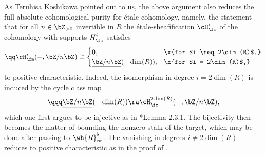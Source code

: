 \brems
\remi
As Teruhisa Koshikawa pointed out to us, the above argument also reduces the full absolute cohomological purity for \'{e}tale cohomology, namely, the statement that for all $n \in \bZ_{> 0}$ invertible in $R$ the \'{e}tale-sheafification $\cH^i_\fm$ of the cohomology with supports $H^i_\fm$ satisfies
\[
\qq \cH^i_\fm(-, \bZ/n\bZ) \cong \begin{cases} 0, & \x{for $i \neq 2\dim(R)$,} \\ \underline{\bZ/n\bZ}(-\dim(R)), & \x{for $i = 2\dim(R)$,} \end{cases}
\]
to positive characteristic. Indeed, the isomorphism in degree $i = 2\dim(R)$ is induced by the cycle class map
\[
\qqq \underline{\bZ/n\bZ}(-\dim(R)) \ra \cH^{2\dim(R)}_\fm(-, \bZ/n\bZ),
\]
which one first argues to be injective as in \cite{Fuj02}*{Lemma 2.3.1}. The bijectivity then becomes the matter of bounding the nonzero stalk of the target, which may be done after passing to $\wh{R}^\flat_\infty$. The vanishing in degrees $i \neq 2\dim(R)$ reduces to positive characteristic as in the proof of .

